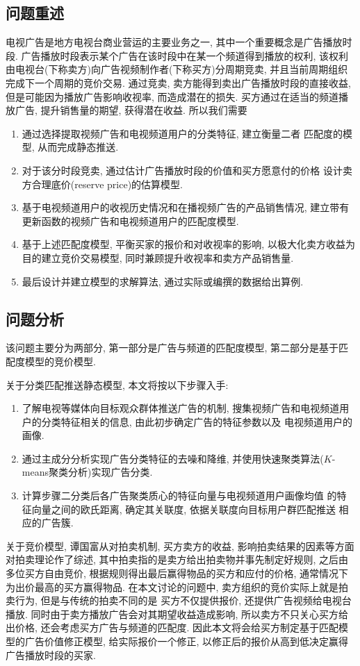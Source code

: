 \subsection{问题重述}
电视广告是地方电视台商业营运的主要业务之一,
其中一个重要概念是广告播放时段.
广告播放时段表示某个广告在该时段中在某一个频道得到播放的权利,
该权利由电视台(下称卖方)向广告视频制作者(下称买方)分周期竞卖,
并且当前周期组织完成下一个周期的竞价交易.
通过竞卖, 卖方能得到卖出广告播放时段的直接收益,
但是可能因为播放广告影响收视率, 而造成潜在的损失.
买方通过在适当的频道播放广告, 提升销售量的期望, 获得潜在收益.
所以我们需要
\begin{enumerate}
    \item 通过选择提取视频广告和电视频道用户的分类特征, 建立衡量二者
        匹配度的模型, 从而完成静态推送.
    \item 对于该分时段竞卖, 通过估计广告播放时段的价值和买方愿意付的价格
        设计卖方合理底价(reserve price)的估算模型.
    \item 基于电视频道用户的收视历史情况和在播视频广告的产品销售情况,
        建立带有更新函数的视频广告和电视频道用户的匹配度模型.
    \item 基于上述匹配度模型, 平衡买家的报价和对收视率的影响,
        以极大化卖方收益为目的建立竞价交易模型, 同时兼顾提升收视率和卖方产品销售量.
    \item 最后设计并建立模型的求解算法, 通过实际或编撰的数据给出算例.
\end{enumerate}

\subsection{问题分析}

该问题主要分为两部分, 第一部分是广告与频道的匹配度模型,
第二部分是基于匹配度模型的竞价模型.

关于分类匹配推送静态模型, 本文将按以下步骤入手:
\begin{enumerate}
    \item 了解电视等媒体向目标观众群体推送广告的机制,
        搜集视频广告和电视频道用户的分类特征相关的信息, 由此初步确定广告的特征参数以及
        电视频道用户的画像.
    \item 通过主成分分析实现广告分类特征的去噪和降维,
        并使用快速聚类算法($K$-means聚类分析)实现广告分类.
    \item 计算步骤二分类后各广告聚类质心的特征向量与电视频道用户画像均值
        的特征向量之间的欧氏距离, 确定其关联度, 依据关联度向目标用户群匹配推送
        相应的广告簇.
\end{enumerate}

关于竞价模型, 谭国富从对拍卖机制, 买方卖方的收益, 影响拍卖结果的因素等方面
对拍卖理论作了综述\citep{Tan},
其中拍卖指的是卖方给出拍卖物并事先制定好规则, 之后由多位买方自由竞价,
根据规则得出最后赢得物品的买方和应付的价格, 通常情况下为出价最高的买方赢得物品.
在本文讨论的问题中, 卖方组织的竞价实际上就是拍卖行为, 但是与传统的拍卖不同的是
买方不仅提供报价, 还提供广告视频给电视台播放.
同时由于卖方播放广告会对其期望收益造成影响,
所以卖方不只关心买方给出价格, 还会考虑买方广告与频道的匹配度.
因此本文将会给买方制定基于匹配模型的广告价值修正模型,
给实际报价一个修正, 以修正后的报价从高到低决定赢得广告播放时段的买家.
